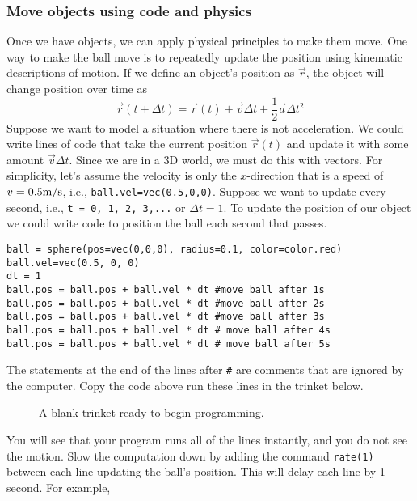 \subsubsection{Move objects using code and physics}

Once we have objects, we can apply physical principles to make them move. One way to make the ball move is to repeatedly update the position using kinematic descriptions of motion. If we define an object's position as $\vec r$, the object will change position over time as
\begin{equation}
\vec r(t + \Delta t) = \vec r(t) + \vec v\Delta t + \frac{1}{2}\vec a\Delta t^2
\end{equation}
Suppose we want to model a situation where there is not acceleration. We could write lines of code that take the current position $\vec r(t)$ and update it with some amount $\vec v\Delta t$. Since we are in a 3D world, we must do this with vectors. For simplicity, let's assume the velocity is only the $x$-direction that is a speed of $v = 0.5 {\rm m/s}$, i.e., \texttt{ball.vel=vec(0.5,0,0)}. Suppose we want to update every second, i.e., \texttt{t = 0, 1, 2, 3,...} or $\Delta t = 1$. To update the position of our object we could write code to position the ball each second that passes.

\begin{verbatim}
ball = sphere(pos=vec(0,0,0), radius=0.1, color=color.red)
ball.vel=vec(0.5, 0, 0)
dt = 1
ball.pos = ball.pos + ball.vel * dt #move ball after 1s
ball.pos = ball.pos + ball.vel * dt #move ball after 2s
ball.pos = ball.pos + ball.vel * dt #move ball after 3s
ball.pos = ball.pos + ball.vel * dt # move ball after 4s
ball.pos = ball.pos + ball.vel * dt # move ball after 5s
\end{verbatim}

The statements at the end of the lines after \texttt{\#} are comments that are ignored by the computer. Copy the code above run these lines in the trinket below.

\begin{figure}[!htbp]
\centering
\caption[]{A blank trinket ready to begin programming.}
\label{app:visualpython:blanktrinket}
\end{figure}

You will see that your program runs all of the lines instantly, and you do not see the motion. Slow the computation down by adding the command \texttt{rate(1)} between each line updating the ball's position. This will delay each line by 1 second. For example,

